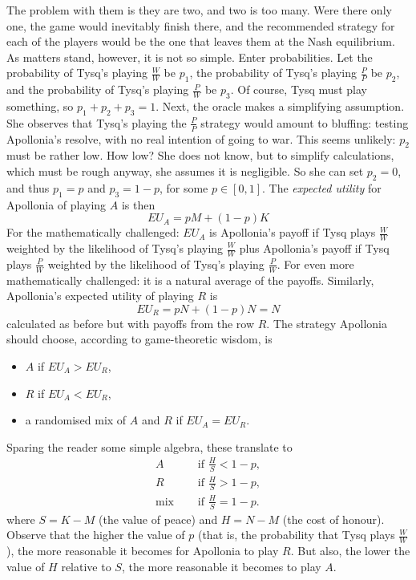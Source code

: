\documentclass{amsart}
\begin{document}
\bigskip
The problem with them is they are two, and two is too many. Were there only one,
the game would inevitably finish there, and the recommended strategy 
for each of the players would be the one that leaves them at the Nash
equilibrium. As matters stand, however, it is not so simple. 
Enter probabilities. Let the probability of
Tysq's playing $\frac{W}{W}$ be $p_1$, the probability of
Tysq's playing $\frac{P}{P}$ be $p_2$, and the probability of
Tysq's playing $\frac{P}{W}$ be $p_3$. Of course, Tysq must play
something, so $p_1 + p_2 + p_3 = 1$. Next, the oracle makes a
simplifying assumption. She observes that Tysq's playing the $\frac{P}{P}$
strategy would amount to bluffing: testing Apollonia's resolve, with no real
intention of going to war. This seems unlikely: $p_2$ must be rather low.
How low? She does not know, but to simplify calculations, which
must be rough anyway, she assumes it is negligible. So she can set $p_2 = 0$, and
thus $p_1 = p$ and $p_3 = 1-p$, for some $p\in[0,1]$. The \emph{expected utility} for
Apollonia of playing $A$ is then
$$
EU_A = pM +(1-p)K
$$
For the mathematically challenged: $EU_A$ is Apollonia's payoff if Tysq
plays $\frac{W}{W}$ weighted by the likelihood of Tysq's playing 
$\frac{W}{W}$ plus Apollonia's payoff if Tysq plays
$\frac{P}{W}$ weighted by the likelihood of Tysq's playing 
$\frac{P}{W}$. For even more
mathematically challenged: it is a natural average of the payoffs.
Similarly, Apollonia's expected utility of playing $R$ is 
$$
EU_R = pN +(1-p)N = N
$$
calculated as before but with payoffs from the row $R$. The strategy Apollonia
should choose, according to game-theoretic wisdom, is 
\begin{itemize}
\item $A$ if $EU_A > EU_R$,
\item $R$ if $EU_A < EU_R$,
\item a randomised mix of $A$ and $R$ if $EU_A = EU_R$.
\end{itemize}
Sparing the reader some simple algebra, these translate to
\begin{align*}
A &\quad\text{ if } \frac{H}{S} < 1-p,\\
R &\quad\text{ if } \frac{H}{S} > 1-p,\\
\text{mix} &\quad\text{ if } \frac{H}{S} = 1-p.
\end{align*}
where $S = K-M$ (the value of peace) and $H = N-M$ (the cost of honour). Observe
that the higher the value of $p$ (that is, the probability that Tysq plays
$\frac{W}{W}$), the more reasonable it becomes for Apollonia to play $R$.
But also, the lower the value of $H$ relative to $S$, the more reasonable it
becomes to play $A$. 
\end{document}
